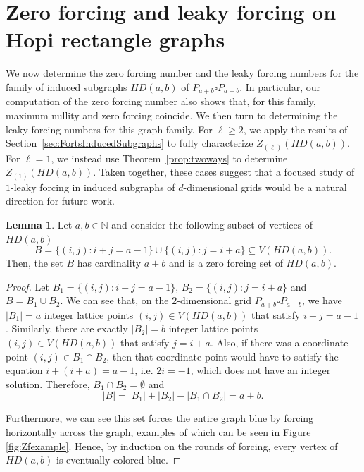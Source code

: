 \documentclass[11pt]{article}
\theoremstyle{plain} \newtheorem{question}{Question}
\theoremstyle{definition}
\newtheorem{lem}[thm]{Lemma}
\begin{document}
\section{Zero forcing and leaky forcing on Hopi rectangle graphs}\label{sec:ZFonHopiRectanlges}
We now determine the zero forcing number and the leaky forcing numbers for the family of induced subgraphs \(HD(a,b)\) of \(P_{a+b}\square P_{a+b}\). In particular, our computation of the zero forcing number also shows that, for this family, maximum nullity and zero forcing coincide. We then turn to determining the leaky forcing numbers for this graph family. For \(\ell\ge 2\), we apply the results of Section~\ref{sec:FortsInducedSubgraphs} to fully characterize \(Z_{(\ell)}(HD(a,b))\). For \(\ell=1\), we instead use Theorem~\ref{prop:twoways} to determine \(Z_{(1)}(HD(a,b))\). Taken together, these cases suggest that a focused study of \(1\)-leaky forcing in induced subgraphs of \(d\)-dimensional grids would be a natural direction for future work.



\begin{lem}\label{lem:ZF Upper Bound}
Let $a,b \in \mathbb{N}$ and consider the following subset of vertices of $HD(a,b)$ 
\begin{equation}\label{eq:ZeroForcingSet}
    B=\{(i,j): i+j=a-1\}\cup\{(i,j):j=i+a\} \subseteq V(HD(a,b)).
\end{equation}
Then, the set $B$ has cardinality $a+b$ and is a zero forcing set of $HD(a,b)$.
\end{lem}
\begin{proof} 
\noindent Let $B_1 = \{(i,j): i+j=a-1\}$, $B_2 =\{(i,j):j=i+a\} $ and $B= B_1 \cup B_2$. We can see that, on the 2-dimensional grid $P_{a+b}\square P_{a+b}$, we have $|B_1| = a$ integer lattice points $(i,j)\in V(HD(a,b))$ that satisfy $i+j = a-1$. Similarly, there are exactly $|B_2| = b$ integer lattice points $(i,j)\in V(HD(a,b))$ that satisfy $j=i+a$. Also, if there was a coordinate point $(i,j)\in B_1\cap B_2$, then that coordinate point would have to satisfy the equation $i+(i+a) = a-1$, i.e. $2i = -1$, which does not have an integer solution. Therefore, $B_1\cap B_2 = \emptyset$ and 
    $$|B| = |B_1| + |B_2| - |B_1\cap B_2| = a+b.$$

\noindent Furthermore, we can see this set forces the entire graph blue by forcing horizontally across the graph, examples of which can be seen in Figure \ref{fig:Zfexample}. Hence, by induction on the rounds of forcing, every vertex of $HD(a,b)$ is eventually colored blue.
\end{proof}
\end{document}
